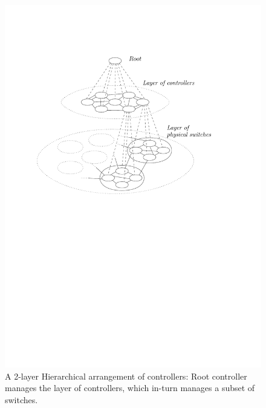 \documentclass[10pt, twocolumn]{article}
\begin{document}
\begin{figure}
\includegraphics[scale=0.5]{hierarchy}
\caption{A 2-layer Hierarchical arrangement of controllers: Root controller manages the layer of controllers, which in-turn manages a subset of switches.}
\label{fig:hierarchy}
\end{figure}
\end{document}
